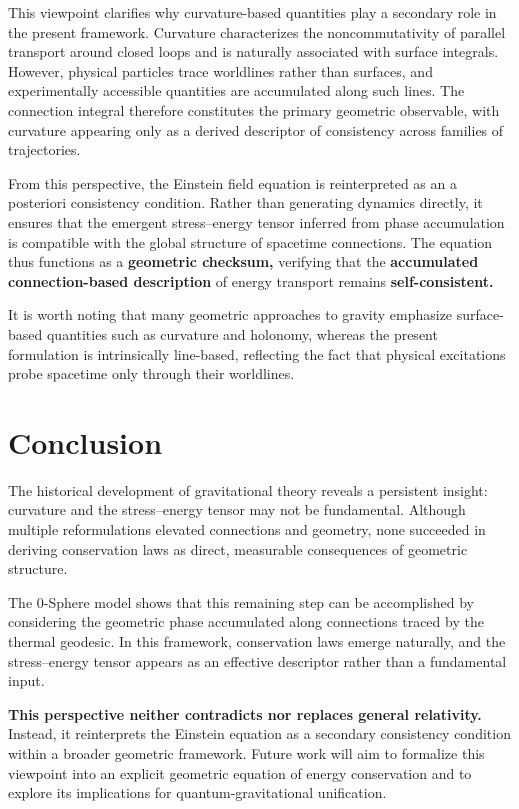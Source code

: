 \documentclass[%
 reprint,
 amsmath,amssymb,
 aps,
 prb,
]{revtex4-2}
\numberwithin{equation}{section}
\begin{document}
This viewpoint clarifies why curvature-based quantities play a secondary role in the present framework. 
Curvature characterizes the noncommutativity of parallel transport around closed loops and is naturally associated with surface integrals. 
However, physical particles trace worldlines rather than surfaces, and experimentally accessible quantities are accumulated along such lines. 
The connection integral therefore constitutes the primary geometric observable, with curvature appearing only as a derived descriptor of consistency across families of trajectories.

From this perspective, the Einstein field equation is reinterpreted as an a posteriori consistency condition. 
Rather than generating dynamics directly, it ensures that the emergent stress--energy tensor inferred from phase accumulation is compatible with the global structure of spacetime connections. 
The equation thus functions as a \textbf{geometric checksum,} verifying that the \textbf{accumulated connection-based description} of energy transport remains \textbf{self-consistent.}

It is worth noting that many geometric approaches to gravity emphasize surface-based quantities such as curvature and holonomy, whereas the present formulation is intrinsically line-based, reflecting the fact that physical excitations probe spacetime only through their worldlines.



\section{Conclusion}
\label{sec:conclusion}

The historical development of gravitational theory reveals a persistent insight: curvature and the stress--energy tensor may not be fundamental. 
Although multiple reformulations elevated connections and geometry, none succeeded in deriving conservation laws as direct, measurable consequences of geometric structure.

The 0-Sphere model shows that this remaining step can be accomplished by considering the geometric phase accumulated along connections traced by the thermal geodesic. 
In this framework, conservation laws emerge naturally, and the stress--energy tensor appears as an effective descriptor rather than a fundamental input.

\textbf{This perspective neither contradicts nor replaces general relativity.} Instead, it reinterprets the Einstein equation as a secondary consistency condition within a broader geometric framework. Future work will aim to formalize this viewpoint into an explicit geometric equation of energy conservation and to explore its implications for quantum-gravitational unification.
\end{document}
